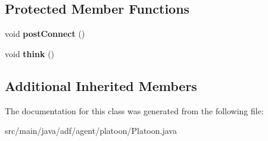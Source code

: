 \subsection*{Protected Member Functions}
\begin{DoxyCompactItemize}
\item 
\hypertarget{classadf_1_1agent_1_1platoon_1_1Platoon_adee23d3f90f95d1f834c50bd55a6036e}{}\label{classadf_1_1agent_1_1platoon_1_1Platoon_adee23d3f90f95d1f834c50bd55a6036e} 
void {\bfseries post\+Connect} ()
\item 
\hypertarget{classadf_1_1agent_1_1platoon_1_1Platoon_a9fe4bca1e1a3ca8e1086689251c6b272}{}\label{classadf_1_1agent_1_1platoon_1_1Platoon_a9fe4bca1e1a3ca8e1086689251c6b272} 
void {\bfseries think} ()
\end{DoxyCompactItemize}
\subsection*{Additional Inherited Members}


The documentation for this class was generated from the following file\+:\begin{DoxyCompactItemize}
\item 
src/main/java/adf/agent/platoon/Platoon.\+java\end{DoxyCompactItemize}
